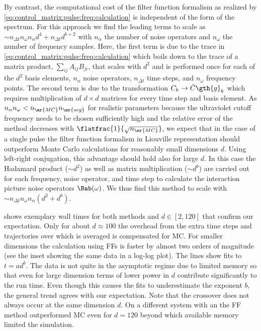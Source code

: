 By contrast, the computational cost of the filter function formalism as realized by \cref{eq:control_matrix:pulse:freq:calculation} is independent of the form of the spectrum. For this approach we find the leading terms to scale as $\sim n_{\Delta t} n_\omega n_\alpha d^{4} + n_{\Delta t} d^{b+2}$ with $n_\alpha$ the number of noise operators and $n_\omega$ the number of frequency samples. Here, the first term is due to the trace in \cref{eq:control_matrix:pulse:freq:calculation} which boils down to the trace of a matrix product, $\sum_{ij} A_{ij} B_{ji}$, that scales with $d^2$ and is performed once for each of the $d^2$ basis elements, $n_\alpha$ noise operators, $n_{\Delta t}$ time steps, and $n_\omega$ frequency points. The second term is due to the transformation $C_k\rightarrow\bar{C}\gth{g}_k$ which requires multiplication of $d\times d$ matrices for every time step and basis element. As $n_\alpha n_\omega < n_\mr{MC} n_\mr{seg}$ for realistic parameters because the ultraviolet cutoff frequency needs to be chosen sufficiently high and the relative error of the method decreases with $\flatfrac{1}{\sqrt{n_\mr{MC}}}$, we expect that in the case of a single pulse the filter function formalism in Liouville representation should outperform Monte Carlo calculations for reasonably small dimensions $d$. Using left-right conjugation, this advantage should hold also for large $d$. In this case the Hadamard product ($\sim d^2$) as well as matrix multiplication ($\sim d^b$) are carried out for each frequency, noise operator, and time step to calculate the interaction picture noise operators $\Bab(\omega)$. We thus find this method to scale with $\sim n_{\Delta t} n_\omega n_\alpha (d^2 + d^b)$.

 shows exemplary wall times for both methods and $d\in[2,120]$ that confirm our expectation. Only for about $d\approx\num{100}$ the overhead from the extra time steps and trajectories over which is averaged is compensated for MC. For smaller dimensions the calculation using FFs is faster by almost two orders of magnitude (see the inset showing the same data in a log-log plot). The lines show fits to $t = a d^b$. The data is not quite in the asymptotic regime due to limited memory so that even for large dimension terms of lower power in $d$ contribute significantly to the run time. Even though this causes the fits to underestimate the exponent $b$, the general trend agrees with our expectation. Note that the crossover does not always occur at the same dimension $d$. On a different system with an \fastprocessor the FF method outperformed MC even for $d = 120$ beyond which available memory limited the simulation.

